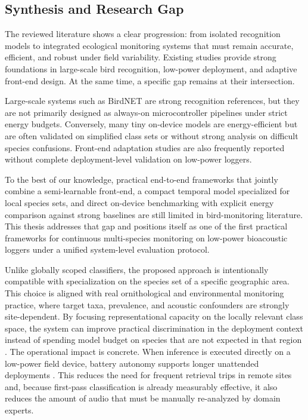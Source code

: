\documentclass[a4paper,singleside,12pt]{report} %
\begin{document}
	\subsection{Synthesis and Research Gap}
	The reviewed literature shows a clear progression: from isolated recognition models to integrated ecological monitoring systems that must remain accurate, efficient, and robust under field variability. Existing studies provide strong foundations in large-scale bird recognition, low-power deployment, and adaptive front-end design. At the same time, a specific gap remains at their intersection.

	Large-scale systems such as BirdNET are strong recognition references, but they are not primarily designed as always-on microcontroller pipelines under strict energy budgets. Conversely, many tiny on-device models are energy-efficient but are often validated on simplified class sets or without strong analysis on difficult species confusions. Front-end adaptation studies are also frequently reported without complete deployment-level validation on low-power loggers.

	To the best of our knowledge, practical end-to-end frameworks that jointly combine a semi-learnable front-end, a compact temporal model specialized for local species sets, and direct on-device benchmarking with explicit energy comparison against strong baselines are still limited in bird-monitoring literature. This thesis addresses that gap and positions itself as one of the first practical frameworks for continuous multi-species monitoring on low-power bioacoustic loggers under a unified system-level evaluation protocol.
	
	Unlike globally scoped classifiers, the proposed approach is intentionally compatible with specialization on the species set of a specific geographic area. This choice is aligned with real ornithological and environmental monitoring practice, where target taxa, prevalence, and acoustic confounders are strongly site-dependent. By focusing representational capacity on the locally relevant class space, the system can improve practical discrimination in the deployment context instead of spending model budget on species that are not expected in that region \cite{birdnet2021}. The operational impact is concrete. When inference is executed directly on a low-power field device, battery autonomy supports longer unattended deployments \cite{audiomoth2019,tinychirp2024}. This reduces the need for frequent retrieval trips in remote sites and, because first-pass classification is already measurably effective, it also reduces the amount of audio that must be manually re-analyzed by domain experts.
\end{document}
